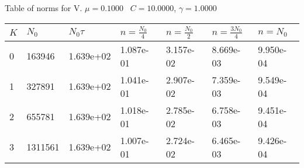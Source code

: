\begin{center}
Table of norms for V. $\mu = 0.1000$ \, $C = 10.0000$, $\gamma = 1.0000$
  
\begin{tabular}{|p{0.8in}|p{0.8in}|p{0.8in}|p{0.8in}|p{0.8in}|p{0.8in}|p{0.8in}|} \hline
$K$ &$N_0$ &$N_0 \tau$ &$n = \frac{N_0}{4}$ &$n = \frac{N_0}{2}$ &$n = \frac{3N_0}{4}$ &$n = N_0$ \\ \hline 
0 &163946 &1.639e+02 &1.087e-01 &3.157e-02 &8.669e-03 &9.950e-04 \\ \hline 
1 &327891 &1.639e+02 &1.041e-01 &2.907e-02 &7.359e-03 &9.549e-04 \\ \hline 
2 &655781 &1.639e+02 &1.018e-01 &2.785e-02 &6.758e-03 &9.451e-04 \\ \hline 
3 &1311561 &1.639e+02 &1.007e-01 &2.724e-02 &6.465e-03 &9.426e-04 \\ \hline 

\end{tabular}\\[20pt]
\end{center}
